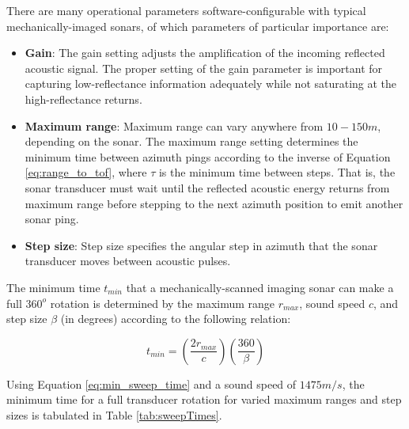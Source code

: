 There are many operational parameters software-configurable with typical mechanically-imaged sonars, of which parameters of particular importance are:

\begin{itemize}
\item \textbf{Gain}: The gain setting adjusts the amplification of the incoming reflected acoustic signal.
The proper setting of the gain parameter is important for capturing low-reflectance information adequately while not saturating at the high-reflectance returns.

\item \textbf{Maximum range}: Maximum range can vary anywhere from $10-150m$, depending on the sonar.
The maximum range setting determines the minimum time between azimuth pings according to the inverse of Equation \ref{eq:range_to_tof}, where $\tau$ is the minimum time between steps.
That is, the sonar transducer must wait until the reflected acoustic energy returns from maximum range before stepping to the next azimuth position to emit another sonar ping.

\item \textbf{Step size}: Step size specifies the angular step in azimuth that the sonar transducer moves between acoustic pulses.

\end{itemize}

\noindent The minimum time $t_{min}$ that a mechanically-scanned imaging sonar can make a full $360^{o}$ rotation is determined by the maximum range $r_{max}$, sound speed $c$, and step size $\beta$ (in degrees) according to the following relation:

\begin{equation}
t_{min} = (\frac{2 r_{max}}{c}) (\frac{360}{\beta})
\label{eq:min_sweep_time}
\end{equation}

Using Equation \ref{eq:min_sweep_time} and a sound speed of $1475 m/s$, the minimum time for a full transducer rotation for varied maximum ranges and step sizes is tabulated in Table \ref{tab:sweepTimes}.

